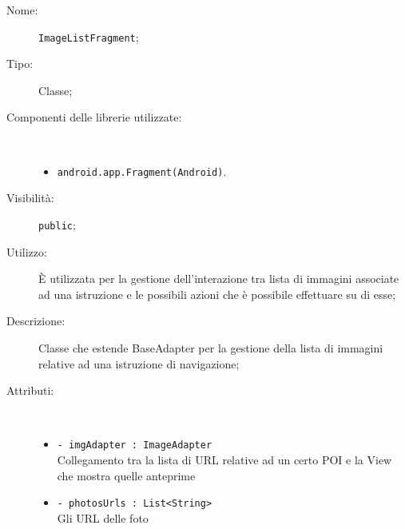 \documentclass[../DefinizioneDiProdotto.tex]{subfiles}
\begin{document}
    \begin{description}
\item[Nome:] \texttt{ImageListFragment};
\item[Tipo:] Classe;
\item[Componenti delle librerie utilizzate:] \
\begin{itemize}
\item \texttt{android.app.Fragment(Android)}.

\end{itemize}
\item[Visibilità:] \texttt{public};
\item[Utilizzo:] È utilizzata per la gestione dell'interazione tra lista di immagini associate ad una istruzione e le possibili azioni che è possibile effettuare su di esse;
\item[Descrizione:] Classe che estende BaseAdapter per la gestione della lista di immagini relative ad una istruzione di navigazione;
\item[Attributi:] \
\begin{itemize}
\item \texttt{- imgAdapter : ImageAdapter}\\
Collegamento tra la lista di URL relative ad un certo POI e la View che mostra quelle anteprime

\item \texttt{- photosUrls : List<String>}\\
Gli URL delle foto


\end{itemize}
\end{description}
\end{document}
